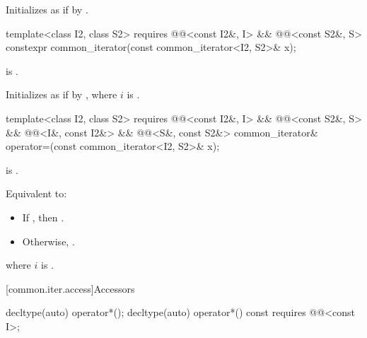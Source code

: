 \begin{itemdescr}
\pnum
\effects
Initializes  as if by
.
\end{itemdescr}

%
\begin{itemdecl}
template<class I2, class S2>
  requires @@<const I2&, I> && @@<const S2&, S>
    constexpr common_iterator(const common_iterator<I2, S2>& x);
\end{itemdecl}

\begin{itemdescr}
\pnum
\expects
{} is .

\pnum
\effects
Initializes  as if by
,
where $i$ is .
\end{itemdescr}

%
\begin{itemdecl}
template<class I2, class S2>
  requires @@<const I2&, I> && @@<const S2&, S> &&
           @@<I&, const I2&> && @@<S&, const S2&>
    common_iterator& operator=(const common_iterator<I2, S2>& x);
\end{itemdecl}

\begin{itemdescr}
\pnum
\expects
{} is .

\pnum
\effects
Equivalent to:
\begin{itemize}
\item If , then
.

\item Otherwise, .
\end{itemize}
where $i$ is .

\pnum
\returns
{}
\end{itemdescr}

[common.iter.access]{Accessors}

%
\begin{itemdecl}
decltype(auto) operator*();
decltype(auto) operator*() const
  requires @@<const I>;
\end{itemdecl}

